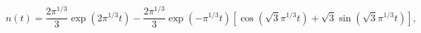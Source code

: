 \begin{equation}\label{eq8b}
n(t)=\frac{2\pi^{1/3}}{3}\exp(2 \pi^{1/3} t)
-\frac{2\pi^{1/3}}{3}\exp(- \pi^{1/3} t)\left[\cos(\sqrt{3}\pi^{1/3} t)
+\sqrt{3}\sin(\sqrt{3}\pi^{1/3} t)\right],
\end{equation}

